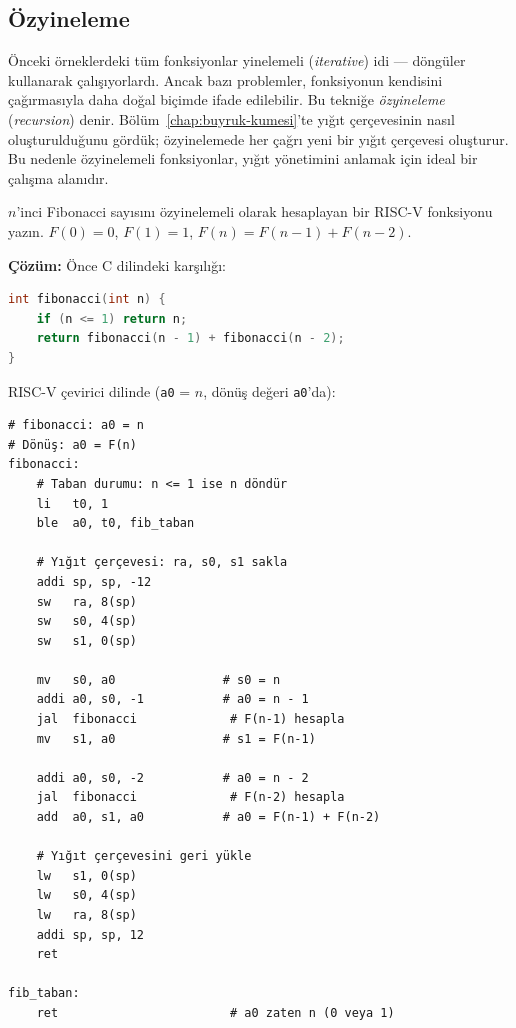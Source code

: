 \subsection{Özyineleme}
\label{subsec:ozyineleme}

Önceki örneklerdeki tüm fonksiyonlar yinelemeli (\emph{iterative}) idi --- döngüler kullanarak çalışıyorlardı. Ancak bazı problemler, fonksiyonun kendisini çağırmasıyla daha doğal biçimde ifade edilebilir. Bu tekniğe \emph{özyineleme} (\emph{recursion}) denir. Bölüm~\ref{chap:buyruk-kumesi}'te yığıt çerçevesinin nasıl oluşturulduğunu gördük; özyinelemede her çağrı yeni bir yığıt çerçevesi oluşturur. Bu nedenle özyinelemeli fonksiyonlar, yığıt yönetimini anlamak için ideal bir çalışma alanıdır.

\begin{ornek}[4.14]
\label{orn:fibonacci}
$n$'inci Fibonacci sayısını özyinelemeli olarak hesaplayan bir RISC-V fonksiyonu yazın. $F(0) = 0$, $F(1) = 1$, $F(n) = F(n-1) + F(n-2)$.

\textbf{Çözüm:} Önce C dilindeki karşılığı:

\begin{lstlisting}[language=C, style=alistirma-kod]
int fibonacci(int n) {
    if (n <= 1) return n;
    return fibonacci(n - 1) + fibonacci(n - 2);
}
\end{lstlisting}

RISC-V çevirici dilinde (\texttt{a0} = $n$, dönüş değeri \texttt{a0}'da):

\begin{lstlisting}[style=riscv]
# fibonacci: a0 = n
# Dönüş: a0 = F(n)
fibonacci:
    # Taban durumu: n <= 1 ise n döndür
    li   t0, 1
    ble  a0, t0, fib_taban

    # Yığıt çerçevesi: ra, s0, s1 sakla
    addi sp, sp, -12
    sw   ra, 8(sp)
    sw   s0, 4(sp)
    sw   s1, 0(sp)

    mv   s0, a0               # s0 = n
    addi a0, s0, -1           # a0 = n - 1
    jal  fibonacci             # F(n-1) hesapla
    mv   s1, a0               # s1 = F(n-1)

    addi a0, s0, -2           # a0 = n - 2
    jal  fibonacci             # F(n-2) hesapla
    add  a0, s1, a0           # a0 = F(n-1) + F(n-2)

    # Yığıt çerçevesini geri yükle
    lw   s1, 0(sp)
    lw   s0, 4(sp)
    lw   ra, 8(sp)
    addi sp, sp, 12
    ret

fib_taban:
    ret                        # a0 zaten n (0 veya 1)
\end{lstlisting}


\end{ornek}
